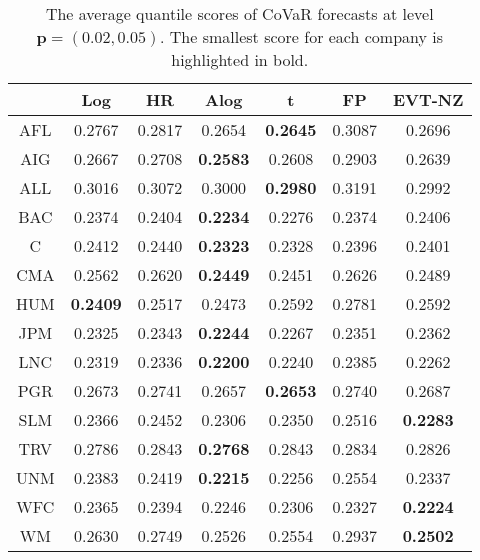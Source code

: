 \documentclass[11pt,letterpaper]{article}
\def\pb{{\mathbf p}}
\numberwithin{equation}{section}
\begin{document}
\begin{table}[ht]
\centering
\footnotesize
\caption{The average quantile scores of CoVaR forecasts at level $\pb = (0.02,0.05)$. The smallest score for each company is highlighted in bold.}
\vspace{24pt}
\begin{tabular}{ccccccc}
\hline
    & Log    & HR                & Alog            & t               & FP              & EVT-NZ         \\ \hline
AFL & 0.2767 & 0.2817           & 0.2654          & \textbf{0.2645} & 0.3087         & 0.2696          \\
AIG & 0.2667 & 0.2708           & \textbf{0.2583} & 0.2608          & 0.2903          & 0.2639          \\
ALL & 0.3016 & 0.3072           & 0.3000          & \textbf{0.2980}          & 0.3191 & 0.2992          \\
BAC & 0.2374 & 0.2404           & \textbf{0.2234} & 0.2276          & 0.2374          & 0.2406          \\
C   & 0.2412 & 0.2440           & \textbf{0.2323} & 0.2328          & 0.2396          & 0.2401          \\
CMA & 0.2562 & 0.2620           & \textbf{0.2449} & 0.2451          & 0.2626          & 0.2489          \\
HUM & \textbf{0.2409} & 0.2517 & 0.2473          & 0.2592          & 0.2781         & 0.2592          \\
JPM & 0.2325 & 0.2343           & \textbf{0.2244} & 0.2267          & 0.2351          & 0.2362          \\
LNC & 0.2319 & 0.2336           & \textbf{0.2200} & 0.2240          & 0.2385          & 0.2262          \\
PGR & 0.2673 & 0.2741           & 0.2657          & \textbf{0.2653} & 0.2740          & 0.2687          \\
SLM & 0.2366 & 0.2452           & 0.2306          & 0.2350          & 0.2516          & \textbf{0.2283} \\
TRV & 0.2786 & 0.2843           & \textbf{0.2768}          & 0.2843          & 0.2834 & 0.2826          \\
UNM & 0.2383 & 0.2419           & \textbf{0.2215} & 0.2256          & 0.2554          & 0.2337          \\
WFC & 0.2365 & 0.2394          & 0.2246          & 0.2306          & 0.2327          & \textbf{0.2224} \\
WM  & 0.2630 & 0.2749           & 0.2526          & 0.2554          & 0.2937          & \textbf{0.2502} \\ \hline
\end{tabular}
\label{ave_score}
\end{table}
\end{document}
